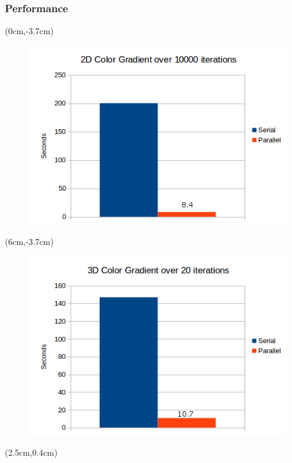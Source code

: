 \documentclass[xcolor=table]{beamer}
\begin{document}
				\begin{frame}
					\frametitle{Performance}
						\begin{textblock*}{5cm}(0cm,-3.7cm)
							\begin{figure}
								\centering
								\includegraphics[scale=0.43]{Resources/2dperfor.png}
							\end{figure}
							\end{textblock*}
							\begin{textblock*}{5cm}(6cm,-3.7cm)
								\begin{figure}
									\centering
									\includegraphics[scale=0.43]{Resources/3dperformance.png}
								\end{figure}
							\end{textblock*}
							\begin{textblock*}{5cm}(2.5cm,0.4cm)
								\begin{figure}

\end{figure}
\end{textblock*}
\end{frame}
\end{document}
